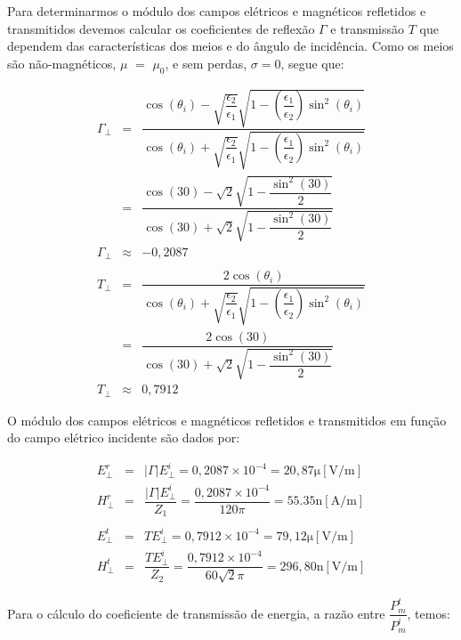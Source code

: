 \begin{enumerate}[1.]
Para determinarmos o módulo dos campos elétricos e magnéticos refletidos e transmitidos devemos calcular os coeficientes de reflexão $\Gamma$ e transmissão $T$ que dependem das características dos meios e do ângulo de incidência. Como os meios são não-magnéticos, $\mu$ $=$ $\mu_{0}$, e sem perdas, $\sigma = 0$, segue que:

\begin{eqnarray*}
\Gamma_{\perp} & = & \dfrac{\cos(\theta_{i}) - \sqrt{\dfrac{\epsilon_{2}}{\epsilon_{1}}}\sqrt{1 - \left(\dfrac{\epsilon_{1}}{\epsilon_{2}}\right)\sin^{2}(\theta_{i})}}{\cos(\theta_{i}) + \sqrt{\dfrac{\epsilon_{2}}{\epsilon_{1}}}\sqrt{1 - \left(\dfrac{\epsilon_{1}}{\epsilon_{2}}\right)\sin^{2}(\theta_{i})}} \nonumber \\
& = & \dfrac{\cos(30) - \sqrt{2}\sqrt{1 - \dfrac{\sin^{2}(30)}{2}}}{\cos(30) + \sqrt{2}\sqrt{1 - \dfrac{\sin^{2}(30)}{2}}}\nonumber \\
\Gamma_{\perp} & \approx & -0,2087 \nonumber \\
& & \\
T_{\perp} & = &\dfrac{2\cos(\theta_{i})}{\cos(\theta_{i}) + \sqrt{\dfrac{\epsilon_{2}}{\epsilon_{1}}}\sqrt{1 - \left(\dfrac{\epsilon_{1}}{\epsilon_{2}}\right)\sin^{2}(\theta_{i})}} \nonumber \\
& = & \dfrac{2\cos(30)}{\cos(30) + \sqrt{2}\sqrt{1 - \dfrac{\sin^{2}(30)}{2}}}\nonumber \\
T_{\perp} & \approx & 0,7912 \nonumber
\end{eqnarray*}

O módulo dos campos elétricos e magnéticos refletidos e transmitidos em função do campo elétrico incidente são dados por:

\begin{eqnarray*}
E^{r}_{\perp} & = & |\Gamma| E^{i}_{\perp} = 0,2087 \times 10^{-4} = 20,87\si{\micro}[\si{\volt/\meter}] \nonumber \\
H^{r}_{\perp} & = & \dfrac{|\Gamma| E^{i}_{\perp}}{Z_{1}} = \dfrac{0,2087 \times 10^{-4}}{120\pi} = 55.35\si{\nano}[\si{\ampere/\meter}]\nonumber \\
& & \\
E^{t}_{\perp} & = & T E^{i}_{\perp} = 0,7912 \times 10^{-4} = 79,12\si{\micro}[\si{\volt/\meter}]\nonumber \\
H^{t}_{\perp} & = & \dfrac{T E^{i}_{\perp}}{Z_{2}} = \dfrac{0,7912 \times 10^{-4}}{60\sqrt{2}\pi} = 296,80\si{\nano}[\si{\volt/\meter}]
\end{eqnarray*}

Para o cálculo do coeficiente de transmissão de energia, a razão entre $\dfrac{P^{t}_{m}}{P^{i}_{m}}$, temos:


\end{enumerate}
